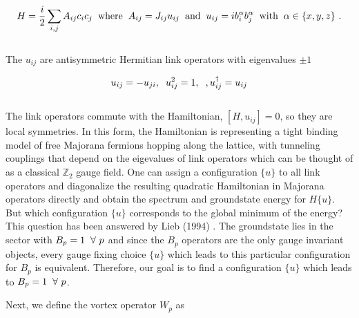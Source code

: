 \documentclass{article}
\begin{document}
\begin{equation}\label{eq:24}
	\begin{aligned}
		H = \frac{i}{2} \sum_{i,j} A_{ij} c_i c_j \hspace{2mm}\text{where}\hspace{2mm} A_{ij} = J_{ij} u_{ij} \hspace{2mm}\text{and}\hspace{2mm} u_{ij} = i b^\alpha_i b^\alpha_j \hspace{2mm}\text{with}\hspace{2mm} \alpha\in \{x,y,z\}~.
	\end{aligned}
\end{equation}\\

The $u_{ij}$ are antisymmetric Hermitian link operators with eigenvalues $\pm 1$

\begin{equation}\label{eq:25}
	\begin{aligned}
		u_{ij} = -u_{ji}, \hspace{2mm} u^2_{ij} = 1, \hspace{2mm}, u^\dagger_{ij} = u_{ij}
	\end{aligned}
\end{equation}\\

The link operators commute with the Hamiltonian, $[H, u_{ij}] = 0$, so they are local symmetries. In this form, the Hamiltonian is representing a tight binding model of free Majorana fermions hopping along the lattice, with tunneling couplings that depend on the eigevalues of link operators which can be thought of as a classical $\mathbb{Z}_2$ gauge field. One can assign a configuration $\{u\}$ to all link operators and diagonalize the resulting quadratic Hamiltonian in Majorana operators directly and obtain the spectrum and groundstate energy for $H\{u\}$. But which configuration $\{u\}$ corresponds to the global minimum of the energy? This question has been answered by Lieb (1994) \cite{kour2014real}. The groundstate lies in the sector with $B_p = 1 \hspace{2mm} \forall ~p$ and since the $B_p$ operators are the only gauge invariant objects, every gauge fixing choice $\{u\}$ which leads to this particular configuration for $B_p$ is equivalent. Therefore, our goal is to find a configuration $\{u\}$ which leads to $B_p = 1 \hspace{2mm} \forall ~p$. 

Next, we define the vortex operator $W_p$ as
\end{document}
